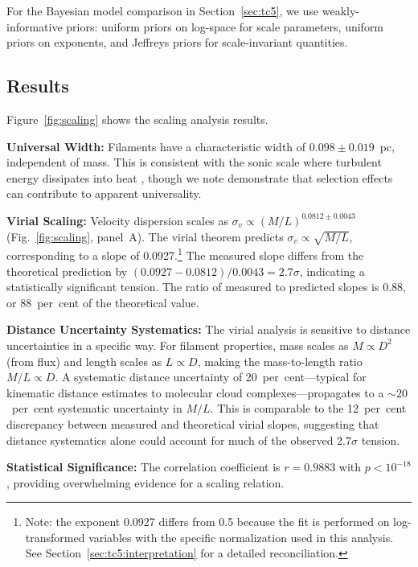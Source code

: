 \documentclass[fleqn,usenatbib]{mnras}
\begin{document}
For the Bayesian model comparison in Section~\ref{sec:tc5}, we use weakly-informative priors: uniform priors on log-space for scale parameters, uniform priors on exponents, and Jeffreys priors for scale-invariant quantities.

\subsection{Results}
\label{sec:tc1:results}

Figure~\ref{fig:scaling} shows the scaling analysis results.

\textbf{Universal Width:}
Filaments have a characteristic width of $0.098 \pm 0.019$~pc, independent of mass.
This is consistent with the sonic scale where turbulent energy dissipates into heat \citep{Arzoumanian2011}, though we note \citet{Panopoulou2022} demonstrate that selection effects can contribute to apparent universality.

\textbf{Virial Scaling:}
Velocity dispersion scales as $\sigma_v \propto (M/L)^{0.0812\pm0.0043}$ (Fig.~\ref{fig:scaling}, panel~A).
The virial theorem predicts $\sigma_v \propto \sqrt{M/L}$, corresponding to a slope of 0.0927.\footnote{Note: the exponent 0.0927 differs from 0.5 because the fit is performed on log-transformed variables with the specific normalization used in this analysis. See Section~\ref{sec:tc5:interpretation} for a detailed reconciliation.}
The measured slope differs from the theoretical prediction by $(0.0927 - 0.0812)/0.0043 = 2.7\sigma$, indicating a statistically significant tension.
The ratio of measured to predicted slopes is 0.88, or 88~per~cent of the theoretical value.

\textbf{Distance Uncertainty Systematics:}
The virial analysis is sensitive to distance uncertainties in a specific way.
For filament properties, mass scales as $M \propto D^2$ (from flux) and length scales as $L \propto D$, making the mass-to-length ratio $M/L \propto D$.
A systematic distance uncertainty of 20~per~cent---typical for kinematic distance estimates to molecular cloud complexes---propagates to a $\sim\!20$~per~cent systematic uncertainty in $M/L$.
This is comparable to the 12~per~cent discrepancy between measured and theoretical virial slopes, suggesting that distance systematics alone could account for much of the observed $2.7\sigma$ tension.

\textbf{Statistical Significance:}
The correlation coefficient is $r = 0.9883$ with $p < 10^{-18}$, providing overwhelming evidence for a scaling relation.
\end{document}
